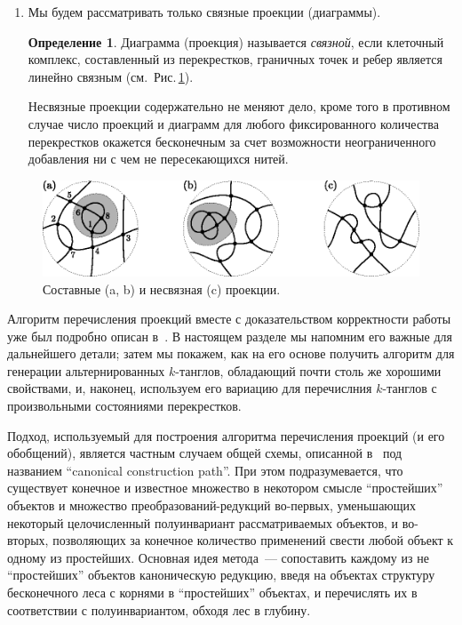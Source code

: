 \documentclass[12pt]{article}
\theoremstyle{plain}
\theoremstyle{definition}
\newtheorem{definition}{Определение}
\def\figureref#1{Рис.\,\protect\ref{#1}}
\begin{document}
\begin{enumerate}
			\item
			Мы будем рассматривать только связные проекции (диаграммы).
			\begin{definition}
				Диаграмма (проекция) называется \textit{связной}, если клеточный комплекс, составленный из перекрестков,
				граничных точек и ребер является линейно связным (см.~\figureref{figure:composite-proj}).
			\end{definition}
			Несвязные проекции содержательно не меняют дело, кроме того в противном случае число проекций и диаграмм для любого
			фиксированного количества перекрестков окажется бесконечным за счет возможности неограниченного добавления ни с чем
			не пересекающихся нитей.
		\end{enumerate}

		\begin{figure}[ht]
			\centering
			\includegraphics{c/composite-non-connected-projections.eps}
			\caption{\footnotesize Составные (a, b) и несвязная (c) проекции.\label{figure:composite-proj}}
		\end{figure}

		Алгоритм перечисления проекций вместе с доказательством корректности работы уже был подробно описан
		в~\cite{BogdanovMeshkovOmelchenkoPetrov2011}. В настоящем разделе мы напомним его важные для дальнейшего детали; затем мы покажем,
		как на его основе получить алгоритм для генерации альтернированных $k$-танглов, обладающий почти столь же хорошими свойствами, и,
		наконец, используем его вариацию для перечислния $k$-танглов с произвольными состояниями перекрестков.

		Подход, используемый для построения алгоритма перечисления проекций (и его обобщений), является частным случаем общей схемы,
		описанной в~\cite{McKay1998}
		под названием ``canonical construction path''. При этом подразумевается, что существует конечное и известное множество в некотором смысле
		``простейших'' объектов и множество преобразований-редукций во-первых, уменьшающих некоторый целочисленный полуинвариант рассматриваемых
		объектов, и во-вторых, позволяющих за конечное количество применений свести любой объект к одному из простейших. Основная идея метода~---
		сопоставить каждому из не ``простейших'' объектов каноническую редукцию, введя на объектах структуру бесконечного леса с корнями в
		``простейших'' объектах, и перечислять их в соответствии с полуинвариантом, обходя лес в глубину.
\end{document}
